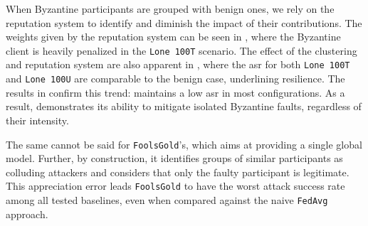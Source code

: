 When Byzantine participants are grouped with benign ones, we rely on the reputation system to identify and diminish the impact of their contributions.
The weights given by the reputation system can be seen in , where the Byzantine client is heavily penalized in the \texttt{Lone~100T} scenario.
The effect of the clustering and reputation system are also apparent in , where the \gls{asr} for both \texttt{Lone~100T} and \texttt{Lone~100U} are comparable to the benign case, underlining \thecontrib resilience.
The results in  confirm this trend: \thecontrib maintains a low \gls{asr} in most configurations.
As a result, \thecontrib demonstrates its ability to mitigate isolated Byzantine faults, regardless of their intensity. 

The same cannot be said for \texttt{FoolsGold}'s, which aims at providing a single global model.
Further, by construction, it identifies groups of similar participants as colluding attackers and considers that only the faulty participant is legitimate. 
This appreciation error leads \texttt{FoolsGold} to have the worst attack success rate among all tested baselines, even when compared against the naive \texttt{FedAvg} approach.


